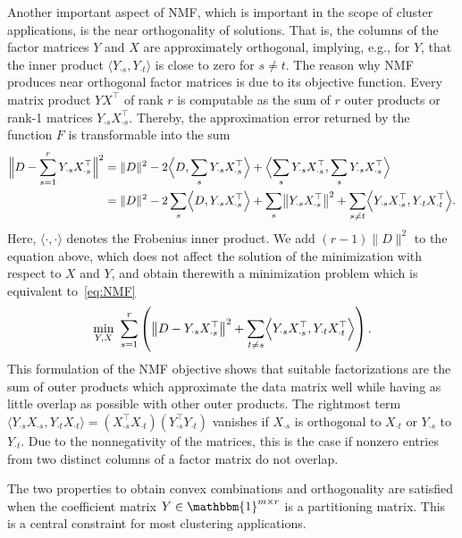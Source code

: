 Another important aspect of NMF, which is important in the scope of cluster applications, is the near orthogonality of solutions. That is, the columns of the factor matrices $Y$ and $X$ are approximately orthogonal, implying, e.g., for $Y$, that the inner product $\langle Y_{\cdot s},Y_{\cdot t}\rangle$ is close to zero for $s\neq t$.    
The reason why NMF produces near orthogonal factor matrices is due to its objective function. Every matrix product $YX^\top$ of rank $r$ is computable as the sum of $r$ outer products or rank-1 matrices $Y_{\cdot s}X_{\cdot s}^\top$. Thereby, the approximation error returned by the function $F$ is transformable into the sum
\begin{align*}
\Bigl\lVert D-\sum_{s=1}^rY_{\cdot s}X_{\cdot s}^\top\Bigr\rVert ^2 &= \lVert D\rVert ^2 -2\Bigl\langle D,\sum_sY_{\cdot s}X_{\cdot s}^\top\Bigr\rangle + \Bigl\langle \sum_sY_{\cdot s}X_{\cdot s}^\top,\sum_sY_{\cdot s}X_{\cdot s}^\top\Bigr\rangle\\
&= \lVert D\rVert ^2 -2\sum_s\Bigl\langle D,Y_{\cdot s}X_{\cdot s}^\top\Bigr\rangle +\sum_s \bigl\lVert Y_{\cdot s}X_{\cdot s}^\top\bigr\rVert ^2 + \sum_{s\neq t}\Bigl\langle Y_{\cdot s}X_{\cdot s}^\top,Y_{\cdot t}X_{\cdot t}^\top\Bigr\rangle.
\end{align*}
Here, $\langle\cdot,\cdot\rangle$ denotes the Frobenius inner product. We add $(r-1)\lVert D\rVert ^2$ to the equation above, which does not affect the solution of the minimization with respect to $X$ and $Y$, and obtain therewith a minimization problem which is equivalent to~\eqref{eq:NMF} 
\begin{align}
\min_{Y,X}\ \sum_{s=1}^r \left( \left\lVert D-Y_{\cdot s}X_{\cdot s}^\top\right\rVert ^2 + \sum_{t\neq s}\Bigl\langle Y_{\cdot s}X_{\cdot s}^\top,Y_{\cdot t}X_{\cdot t}^\top\Bigr\rangle\right).\label{eq:NMFOrth}
\end{align}
This formulation of the NMF objective shows that suitable factorizations are the sum of outer products which approximate the data matrix well while having as little overlap as possible with other outer products. The rightmost term $\langle Y_{\cdot s}X_{\cdot s},Y_{\cdot t}X_{\cdot t}\rangle = (X_{\cdot s}^\top X_{\cdot t})(Y_{\cdot s}^\top Y_{\cdot t})$ vanishes if $X_{\cdot s}$ is orthogonal to $X_{\cdot t}$ or $Y_{\cdot s}$ to $Y_{\cdot t}$. Due to the nonnegativity of the matrices, this is the case if nonzero entries from two distinct columns of a factor matrix do not overlap. 

The two properties to obtain convex combinations and orthogonality are satisfied when the coefficient matrix $Y\in\mathbbm{1}^{m\times r}$ is a partitioning matrix. This is a central constraint for most clustering applications.
